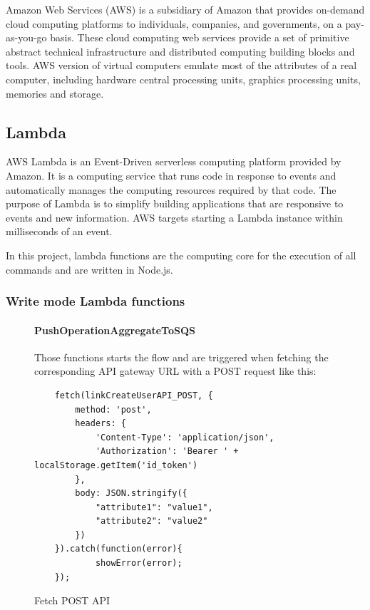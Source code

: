 Amazon Web Services (AWS) is a subsidiary of Amazon that provides on-demand cloud computing platforms to individuals, companies, and governments, on a pay-as-you-go basis. These cloud computing web services provide a set of primitive abstract technical infrastructure and distributed computing building blocks and tools. AWS version of virtual computers emulate most of the attributes of a real computer, including hardware central processing units, graphics processing units, memories and storage.

\subsection{Lambda}
AWS Lambda is an Event-Driven serverless computing platform provided by Amazon. It is a computing service that runs code in response to events and automatically manages the computing resources required by that code. The purpose of Lambda is to simplify building applications that are responsive to events and new information. AWS targets starting a Lambda instance within milliseconds of an event.

In this project, lambda functions are the computing core for the execution of all commands and are written in Node.js.

\subsubsection{Write mode Lambda functions}
\begin{figure} [H]
\paragraph{PushOperationAggregateToSQS} \Spazio
Those functions starts the flow and are triggered when fetching the corresponding API gateway URL with a POST request like this: \\
\begin{lstlisting}
	fetch(linkCreateUserAPI_POST, {
		method: 'post',
		headers: {
			'Content-Type': 'application/json',
			'Authorization': 'Bearer ' + localStorage.getItem('id_token')
		},	
		body: JSON.stringify({
			"attribute1": "value1",
			"attribute2": "value2" 
		})
	}).catch(function(error){
			showError(error);
	});
\end{lstlisting}
	\caption{Fetch POST API}\label{}
\end{figure}

